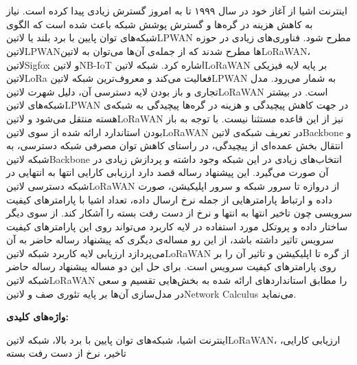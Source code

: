 \newpage\clearpage

\pagestyle{abstract}

\vspace*{-1cm}
\section*{\centering \abstractname}
\vspace*{.5cm}

اینترنت اشیا از آغاز خود در سال ۱۹۹۹ تا به امروز گسترش زیادی پیدا کرده است.
نیاز به کاهش هزینه در گره‌ها و گسترش پوشش شبکه باعث شده است که الگوی
شبکه‌های توان پایین با برد بلند یا
‌لاتین{LPWAN} مطرح شود.
فناوری‌های زیادی در حوزه ‌لاتین{LPWAN}ها مطرح شدند که از جمله‌ی آن‌ها می‌توان به ‌لاتین{LoRaWAN}، ‌لاتین{Sigfox} و ‌لاتین{NB-IoT}
اشاره کرد. شبکه ‌لاتین{LoRaWAN} بر پایه لایه فیزیکی ‌لاتین{LoRa} فعالیت می‌کند و
معروف‌ترین شبکه ‌لاتین{LPWAN} به شمار می‌رود. مدل تجاری و باز بودن
لایه دسترسی آن، دلیل شهرت ‌لاتین{LoRaWAN} است.
در بیشتر شبکه‌های ‌لاتین{LPWAN} در جهت کاهش پیچیدگی و هزینه در گره‌ها پیچیدگی به شبکه‌ی هسته منتقل می‌شود و ‌لاتین{LoRaWAN}
نیز از این قاعده مستثنا نیست.
با توجه به باز بودن استاندارد ارائه شده از سوی ‌لاتین{LoRaWAN} در تعریف شبکه‌ی ‌لاتین{Backbone} و
انتقال بخش عمده‌ای از پیچیدگی، در راستای کاهش توان مصرفی
شبکه دسترسی، به شبکه ‌لاتین{Backbone} انتخاب‌های زیادی در این شبکه وجود داشته و پردازش زیادی در آن صورت می‌گیرد.
این پیشنهاد رساله قصد دارد ارزیابی کارایی انتها به انتهایی در شبکه دسترسی ‌لاتین{LoRaWAN}
از دروازه تا سرور شبکه و سرور اپلیکیشن،
صورت داده و ارتباط پارامترهایی از جمله نرخ ارسال داده، تعداد اشیا
با پارامترهای کیفیت سرویسی چون تاخیر انتها به انتها و نرخ از دست رفت بسته را آشکار کند.
از سوی دیگر ساختار داده و پروتکل مورد استفاده در لایه کاربرد می‌تواند روی این پارامترهای کیفیت سرویس تاثیر داشته باشد،
از این رو مساله‌ی دیگری که پیشنهاد رساله حاضر به آن می‌پردازد
ارزیابی لایه کاربرد شبکه ‌لاتین{LoRaWAN} از گره تا اپلیکیشن
و تاثیر آن را بر روی پارامترهای کیفیت سرویس است.
برای حل این دو مساله پیشنهاد رساله حاضر شبکه ‌لاتین{LoRaWAN} را
مطابق استانداردهای ارائه شده
به بخش‌هایی تقسیم و سعی در مدل‌سازی آن‌ها بر پایه تئوری صف و ‌لاتین{Network Calculus}
می‌نماید.

\vspace*{2cm}

{%
  \noindent\large\textbf{واژه‌های کلیدی:}
}\par
\vspace*{.5cm}
اینترنت اشیا، شبکه‌های توان پایین با برد بالا، شبکه ‌لاتین{LoRaWAN}، ارزیابی کارایی، تاخیر، نرخ از دست رفت بسته
